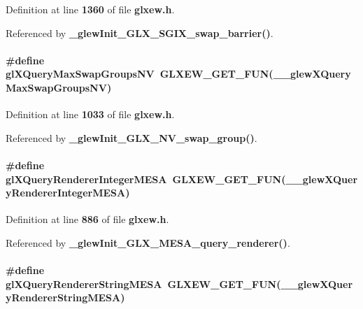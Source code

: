 Definition at line {\bf 1360} of file {\bf glxew.\+h}.



Referenced by {\bf \+\_\+glew\+Init\+\_\+\+G\+L\+X\+\_\+\+S\+G\+I\+X\+\_\+swap\+\_\+barrier()}.

\paragraph[{gl\+X\+Query\+Max\+Swap\+Groups\+NV}]{\setlength{\rightskip}{0pt plus 5cm}\#define gl\+X\+Query\+Max\+Swap\+Groups\+NV~{\bf G\+L\+X\+E\+W\+\_\+\+G\+E\+T\+\_\+\+F\+UN}({\bf \+\_\+\+\_\+glew\+X\+Query\+Max\+Swap\+Groups\+NV})}\label{glxew_8h_a88a097e338c2751f92d354a8d8df2c27}


Definition at line {\bf 1033} of file {\bf glxew.\+h}.



Referenced by {\bf \+\_\+glew\+Init\+\_\+\+G\+L\+X\+\_\+\+N\+V\+\_\+swap\+\_\+group()}.

\paragraph[{gl\+X\+Query\+Renderer\+Integer\+M\+E\+SA}]{\setlength{\rightskip}{0pt plus 5cm}\#define gl\+X\+Query\+Renderer\+Integer\+M\+E\+SA~{\bf G\+L\+X\+E\+W\+\_\+\+G\+E\+T\+\_\+\+F\+UN}({\bf \+\_\+\+\_\+glew\+X\+Query\+Renderer\+Integer\+M\+E\+SA})}\label{glxew_8h_a96b5601f3e2706fbe4bf01f41ed3f355}


Definition at line {\bf 886} of file {\bf glxew.\+h}.



Referenced by {\bf \+\_\+glew\+Init\+\_\+\+G\+L\+X\+\_\+\+M\+E\+S\+A\+\_\+query\+\_\+renderer()}.

\paragraph[{gl\+X\+Query\+Renderer\+String\+M\+E\+SA}]{\setlength{\rightskip}{0pt plus 5cm}\#define gl\+X\+Query\+Renderer\+String\+M\+E\+SA~{\bf G\+L\+X\+E\+W\+\_\+\+G\+E\+T\+\_\+\+F\+UN}({\bf \+\_\+\+\_\+glew\+X\+Query\+Renderer\+String\+M\+E\+SA})}\label{glxew_8h_a8ffd8e8e423cd84d962d66f5726153e6}


